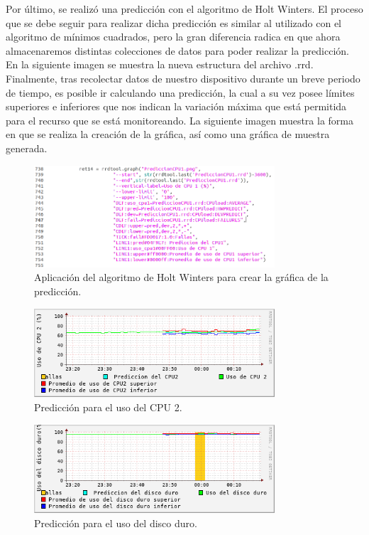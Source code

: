 \noindent
Por último, se realizó una predicción con el algoritmo de Holt Winters. El proceso que se debe seguir para realizar dicha predicción es similar al utilizado con el algoritmo de mínimos cuadrados, pero la gran diferencia radica en que ahora almacenaremos distintas colecciones de datos para poder realizar la predicción. En la siguiente imagen se muestra la nueva estructura del archivo .rrd.
\newline
Finalmente, tras recolectar datos de nuestro dispositivo durante un breve periodo de tiempo, es posible ir calculando una predicción, la cual a su vez posee límites superiores e inferiores que nos indican la variación máxima que está permitida para el recurso que se está monitoreando. La siguiente imagen muestra la forma en que se realiza la creación de la gráfica, así como una gráfica de muestra generada.

\begin{figure}[htbp!]
	\centering
		\includegraphics[width=0.8\textwidth]{imagenes/HoltWinters/CreacionImagenHoltWinters.png}
	\caption{Aplicación del algoritmo de Holt Winters para crear la gráfica de la predicción.}
\end{figure}

\begin{figure}[htbp!]
	\centering
		\includegraphics[width=0.8\textwidth]{imagenes/HoltWinters/PrediccionCPU2.png}
	\caption{Predicción para el uso del CPU 2.}
\end{figure}

\begin{figure}[htbp!]
	\centering
		\includegraphics[width=0.8\textwidth]{imagenes/HoltWinters/PrediccionDisco.png}
	\caption{Predicción para el uso del disco duro.}
\end{figure}

